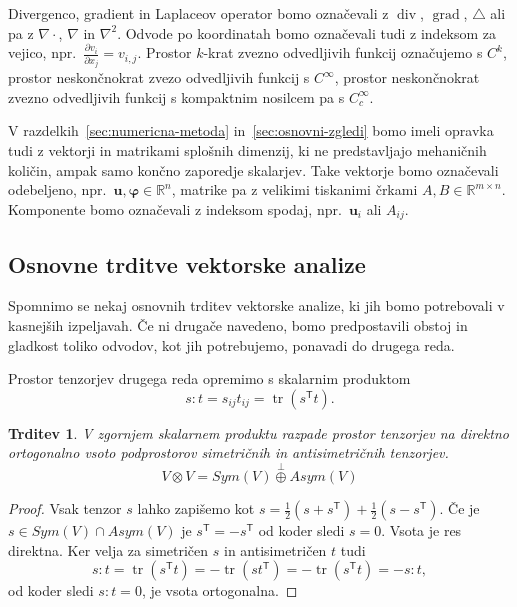 \documentclass[12pt,a4paper,twoside]{article}
\theoremstyle{definition} %
\theoremstyle{plain} %
\newtheorem{trditev}[definicija]{Trditev}
\numberwithin{equation}{section}
\newcommand{\R}{\mathbb R}
\newcommand{\T}{\mathsf{T}}
\newcommand{\lap}{\triangle}
\renewcommand{\div}{\operatorname{div}}
\newcommand{\grad}{\operatorname{grad}}
\renewcommand{\b}{\boldsymbol}
\renewcommand{\phi}{\varphi}
\newcommand{\dpar}[2]{\ensuremath{\frac{\partial #1}{\partial #2}}}
\DeclareMathOperator{\tr}{tr}
\begin{document}
Divergenco, gradient in Laplaceov operator bomo označevali z $\div$, $\grad$,
$\lap$ ali pa z $\nabla\cdot$, $\nabla$ in $\nabla^2$. Odvode po koordinatah bomo označevali tudi z
indeksom za vejico, npr.~$\dpar{v_i}{x_j} = v_{i,j}$. Prostor $k$-krat zvezno odvedljivih funkcij
označujemo s $C^k$, prostor neskončnokrat zvezo odvedljivih funkcij s $C^\infty$, prostor
neskončnokrat zvezno odvedljivih funkcij s kompaktnim nosilcem pa s $C^\infty_c$.

V razdelkih~\ref{sec:numericna-metoda} in~\ref{sec:osnovni-zgledi} bomo imeli opravka tudi z
vektorji in matrikami splošnih dimenzij, ki ne predstavljajo mehaničnih količin, ampak samo končno
zaporedje skalarjev. Take vektorje bomo označevali odebeljeno, npr.~$\b u, \b\phi \in \R^{n}$,
matrike pa z velikimi tiskanimi črkami $A, B \in \R^{m\times n}$. Komponente bomo označevali z
indeksom spodaj, npr.~$\b{u}_i$ ali $A_{ij}$.

\subsection{Osnovne trditve vektorske analize}
\label{sec:uvod-tenz}
Spomnimo se nekaj osnovnih trditev vektorske analize, ki jih bomo
potrebovali v kasnejših izpeljavah. Če ni drugače navedeno, bomo predpostavili obstoj
in gladkost toliko odvodov, kot jih potrebujemo, ponavadi do drugega reda.

Prostor tenzorjev drugega reda opremimo s skalarnim produktom
\begin{equation}
   s:t = s_{ij}t_{ij} = \tr(s^\T t).
\end{equation}
\begin{trditev}
  \label{trd:dot-antisym-tensor}
  V zgornjem skalarnem produktu razpade prostor tenzorjev na direktno
  ortogonalno vsoto podprostorov simetričnih in antisimetričnih tenzorjev.
  \begin{equation}
    V\otimes V = Sym(V) \overset{\perp}{\oplus} Asym(V)
  \end{equation}
\end{trditev}
\begin{proof}
  Vsak tenzor $s$ lahko zapišemo kot $s = \frac12 (s+s^\T) + \frac12(s-s^\T)$.
  Če je $s \in Sym(V)\cap Asym(V)$ je $s^\T = -s^\T$ od koder sledi $s = 0$.
  Vsota je res direktna. Ker velja za simetričen $s$ in antisimetričen $t$ tudi
  \[ s:t = \tr(s^\T t) =  -\tr(s t^\T) = -\tr(s^\T t) = -s:t, \]
  od koder sledi $s:t = 0$, je vsota ortogonalna.
\end{proof}
\end{document}
